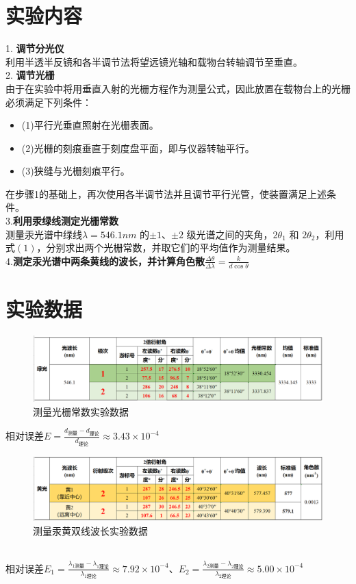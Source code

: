 \documentclass{article}
\begin{document}
\section{实验内容}
1. \textbf{调节分光仪}\\
\hspace*{2em}利用半透半反镜和各半调节法将望远镜光轴和载物台转轴调节至垂直。\\
2. \textbf{调节光栅}\\
\hspace*{2em}由于在实验中将用垂直入射的光栅方程作为测量公式，因此放置在载物台上的光栅必须满足下列条件：
\begin{itemize}
    \item (1)平行光垂直照射在光栅表面。
    \item (2)光栅的刻痕垂直于刻度盘平面，即与仪器转轴平行。
    \item (3)狭缝与光栅刻痕平行。
\end{itemize}
在步骤1的基础上，再次使用各半调节法并且调节平行光管，使装置满足上述条件。\\
3.\textbf{利用汞绿线测定光栅常数}\\
\hspace*{2em}测量汞光谱中绿线\(\lambda = 546.1nm\) 的\(\pm1\)、\(\pm2\) 级光谱之间的夹角，\(2\theta_{1}\) 和 \(2\theta_{2}\)，利用式\((1)\)，分别求出两个光栅常数，并取它们的平均值作为测量结果。\\
4.\textbf{测定汞光谱中两条黄线的波长，并计算角色散$\frac{\Delta \theta}{\Delta \lambda}=\frac{k}{d\cos \theta}$}
\section{实验数据}
\begin{figure}[h]
    \centering
    \includegraphics[width=12cm]{data1.png}
    \caption{测量光栅常数实验数据}
\end{figure}
相对误差$E=\frac{d_{测量}-d_{理论}}{d_{理论}}\approx 3.43\times 10^{-4} $\\
\begin{figure}[h]
    \centering
    \includegraphics[width=12cm]{data2.png}
    \caption{测量汞黄双线波长实验数据}
\end{figure}\\
相对误差$E_1=\frac{\lambda_{1测量}-\lambda_{1理论}}{\lambda_{1理论}}\approx 7.92\times 10^{-4}$、$E_2=\frac{\lambda_{2测量}-\lambda_{2理论}}{\lambda_{2理论}}\approx 5.00\times 10^{-4}$
\end{document}
